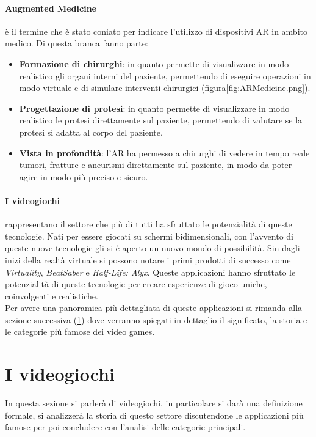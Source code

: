         \paragraph{Augmented Medicine} è il termine che è stato coniato per indicare l'utilizzo di dispositivi AR in ambito medico. Di questa branca fanno parte:
            \begin{itemize}
                \item \textbf{Formazione di chirurghi}: in quanto permette di visualizzare in modo realistico gli organi 
                    interni del paziente, permettendo di eseguire operazioni in modo virtuale e di simulare interventi chirurgici (figura\ref{fig:ARMedicine.png}).
                \item \textbf{Progettazione di protesi}: in quanto permette di visualizzare in modo realistico le protesi 
                    direttamente sul paziente, permettendo di valutare se la protesi si adatta al corpo del paziente.
                \item \textbf{Vista in profondità}: l'AR ha permesso a chirurghi di vedere in tempo reale tumori, fratture e aneurismi direttamente sul paziente, in modo da poter 
                    agire in modo più preciso e sicuro.
            \end{itemize}

        \paragraph{I videogiochi} rappresentano il settore che più di tutti ha sfruttato le potenzialità di queste tecnologie. Nati per essere giocati 
            su schermi bidimensionali, con l'avvento di queste nuove tecnologie gli si è aperto un nuovo mondo di possibilità. Sin dagli inizi della realtà virtuale si possono notare
            i primi prodotti di successo come \textit{Virtuality}, \textit{BeatSaber} e \textit{Half-Life: Alyx}. Queste applicazioni hanno sfruttato le potenzialità di queste
            tecnologie per creare esperienze di gioco uniche, coinvolgenti e realistiche.\\
            Per avere una panoramica più dettagliata di queste applicazioni si rimanda alla sezione successiva (\ref{sec:Videogiochi}) dove verranno spiegati in dettaglio
            il significato, la storia e le categorie più famose dei video games.

\section{I videogiochi}\label{sec:Videogiochi}
    In questa sezione si parlerà di videogiochi, in particolare si darà una definizione formale, si analizzerà la storia di questo settore discutendone le applicazioni più famose per 
    poi concludere con l'analisi delle categorie principali.
    
